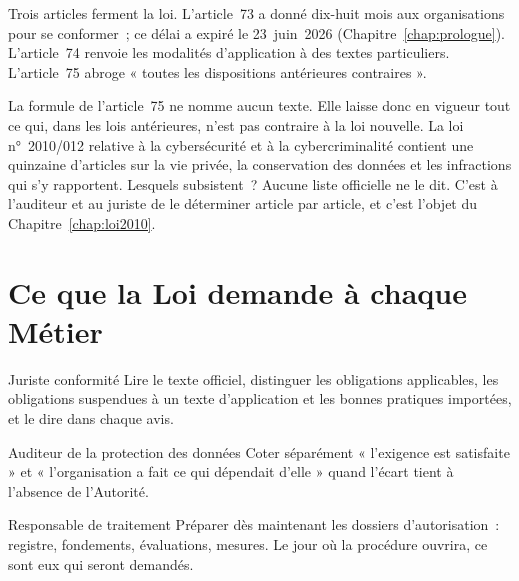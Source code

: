 Trois articles ferment la loi. L'article~73 a donné dix-huit mois aux
organisations pour se conformer~; ce délai a expiré le 23~juin~2026
(Chapitre~\ref{chap:prologue}). L'article~74 renvoie les modalités
d'application à des textes particuliers. L'article~75 abroge « toutes les
dispositions antérieures contraires ».

La formule de l'article~75 ne nomme aucun texte. Elle laisse donc en vigueur
tout ce qui, dans les lois antérieures, n'est pas contraire à la loi
nouvelle. La loi n°~2010/012 relative à la cybersécurité et à la
cybercriminalité contient une quinzaine d'articles sur la vie privée, la
conservation des données et les infractions qui s'y rapportent. Lesquels
subsistent~? Aucune liste officielle ne le dit. C'est à l'auditeur et au
juriste de le déterminer article par article, et c'est l'objet du
Chapitre~\ref{chap:loi2010}.

\section{Ce que la Loi demande à chaque Métier}
\label{sec:c06-metiers}

\begin{boxmetier}{Juriste conformité}
Lire le texte officiel, distinguer les obligations applicables, les
obligations suspendues à un texte d'application et les bonnes pratiques
importées, et le dire dans chaque avis.
\end{boxmetier}

\begin{boxmetier}{Auditeur de la protection des données}
Coter séparément « l'exigence est satisfaite » et « l'organisation a fait ce
qui dépendait d'elle » quand l'écart tient à l'absence de l'Autorité.
\end{boxmetier}

\begin{boxmetier}{Responsable de traitement}
Préparer dès maintenant les dossiers d'autorisation~: registre, fondements,
évaluations, mesures. Le jour où la procédure ouvrira, ce sont eux qui
seront demandés.
\end{boxmetier}

